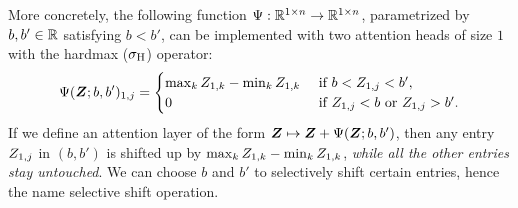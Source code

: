 More concretely, the following function $\Psi: \mathbb{R}^{1 \times n} \to \mathbb{R}^{1 \times n}$, parametrized by $b, b' \in \mathbb{R}$ satisfying $b < b'$, can be implemented with two attention heads of size $1$ with the hardmax ($\sigma_{\rm H}$) operator:
\begin{align*}
    \Psi({\bm{Z}}; b, b')_{1, j} =
    \begin{cases}
        \max_k {Z}_{1,k} - \min_k {Z}_{1,k} & \text{ if } b < {Z}_{1,j} < b', \\
        0 & \text{ if } {Z}_{1,j} < b \text{ or } {Z}_{1,j} > b'.
    \end{cases}
\end{align*}
If we define an attention layer of the form ${\bm{Z}} \mapsto {\bm{Z}} + \Psi({\bm{Z}};b,b')$, then any entry ${Z}_{1,j}$ in $(b,b')$ is shifted up by $\max_k {Z}_{1,k} - \min_k {Z}_{1,k}$, \emph{while all the other entries stay untouched}. We can choose $b$ and $b'$ to selectively shift certain entries, hence the name selective shift operation.

